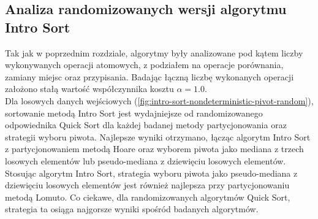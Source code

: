 \begin{figure}[]
	\centering
	
	\caption[]{}
	\label{fig:intro-sort-deterministic-pivot-random}
\end{figure}

\begin{figure}[]
	\centering
	
	\caption[]{}
	\label{fig:intro-sort-deterministic-pivot-reversed}
\end{figure}

\begin{figure}[]
	\centering
	
	\caption[]{}
	\label{fig:intro-sort-deterministic-pivot-density}
\end{figure}

\begin{figure}[]
	\centering
	
	\caption[]{}
	\label{fig:intro-sort-deterministic-pivot-random-all}
\end{figure}

\subsection{Analiza randomizowanych wersji algorytmu Intro Sort}
Tak jak w poprzednim rozdziale, algorytmy były analizowane pod kątem liczby wykonywanych operacji atomowych, z podziałem na operacje porównania, zamiany miejsc oraz przypisania. Badając łączną liczbę wykonanych operacji założono stałą wartość współczynnika kosztu $\alpha = 1.0$.\\

Dla losowych danych wejściowych (\ref{fig:intro-sort-nondeterministic-pivot-random}), sortowanie metodą Intro Sort jest wydajniejsze od randomizowanego odpowiednika Quick Sort dla każdej badanej metody partycjonowania oraz strategii wyboru piwota. Najlepsze wyniki otrzymano, łącząc algorytm Intro Sort z partycjonowaniem metodą Hoare oraz wyborem piwota jako mediana z trzech losowych elementów lub pseudo-mediana z dziewięciu losowych elementów. Stosując algorytm Intro Sort, strategia wyboru piwota jako pseudo-mediana z dziewięciu losowych elementów jest również najlepsza przy partycjonowaniu metodą Lomuto. Co ciekawe, dla randomizowanych algorytmów Quick Sort, strategia ta osiąga najgorsze wyniki spośród badanych algorytmów.\\

